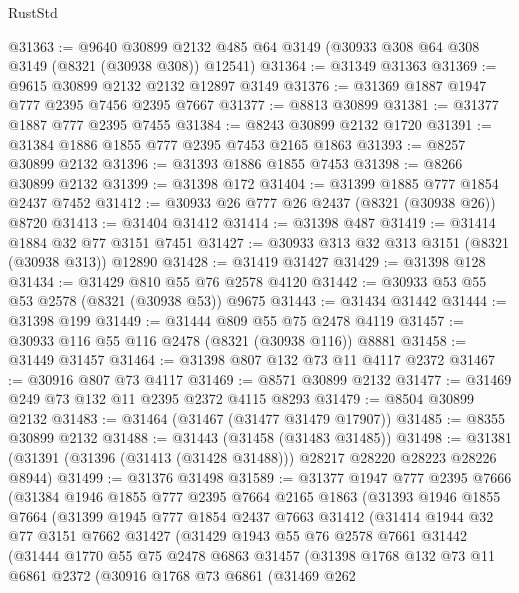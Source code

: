 \begin{lexlean}{RustStd}
\begin{coremodule}
@31363 := @9640
    @30899
    @2132
    @485
    @64
    @3149
    (@30933 @308 @64 @308 @3149 (@8321 (@30938 @308)) @12541)
@31364 := @31349 @31363
@31369 := @9615 @30899 @2132 @2132 @12897 @3149
@31376 := @31369 @1887 @1947 @777 @2395 @7456 @2395 @7667
@31377 := @8813 @30899
@31381 := @31377 @1887 @777 @2395 @7455
@31384 := @8243 @30899 @2132 @1720
@31391 := @31384 @1886 @1855 @777 @2395 @7453 @2165 @1863
@31393 := @8257 @30899 @2132
@31396 := @31393 @1886 @1855 @7453
@31398 := @8266 @30899 @2132
@31399 := @31398 @172
@31404 := @31399 @1885 @777 @1854 @2437 @7452
@31412 := @30933 @26 @777 @26 @2437 (@8321 (@30938 @26)) @8720
@31413 := @31404 @31412
@31414 := @31398 @487
@31419 := @31414 @1884 @32 @77 @3151 @7451
@31427 := @30933 @313 @32 @313 @3151 (@8321 (@30938 @313)) @12890
@31428 := @31419 @31427
@31429 := @31398 @128
@31434 := @31429 @810 @55 @76 @2578 @4120
@31442 := @30933 @53 @55 @53 @2578 (@8321 (@30938 @53)) @9675
@31443 := @31434 @31442
@31444 := @31398 @199
@31449 := @31444 @809 @55 @75 @2478 @4119
@31457 := @30933 @116 @55 @116 @2478 (@8321 (@30938 @116)) @8881
@31458 := @31449 @31457
@31464 := @31398 @807 @132 @73 @11 @4117 @2372
@31467 := @30916 @807 @73 @4117
@31469 := @8571 @30899 @2132
@31477 := @31469 @249 @73 @132 @11 @2395 @2372 @4115 @8293
@31479 := @8504 @30899 @2132
@31483 := @31464 (@31467 (@31477 @31479 @17907))
@31485 := @8355 @30899 @2132
@31488 := @31443 (@31458 (@31483 @31485))
@31498 := @31381 (@31391 (@31396 (@31413 (@31428 @31488))) @28217 @28220 @28223 @28226 @8944)
@31499 := @31376 @31498
@31589 := @31377
    @1947
    @777
    @2395
    @7666
    (@31384
      @1946
      @1855
      @777
      @2395
      @7664
      @2165
      @1863
      (@31393
        @1946
        @1855
        @7664
        (@31399
          @1945
          @777
          @1854
          @2437
          @7663
          @31412
          (@31414
            @1944
            @32
            @77
            @3151
            @7662
            @31427
            (@31429
              @1943
              @55
              @76
              @2578
              @7661
              @31442
              (@31444
                @1770
                @55
                @75
                @2478
                @6863
                @31457
                (@31398
                  @1768
                  @132
                  @73
                  @11
                  @6861
                  @2372
                  (@30916
                    @1768
                    @73
                    @6861
                    (@31469
                      @262

\end{coremodule}
\end{lexlean}
